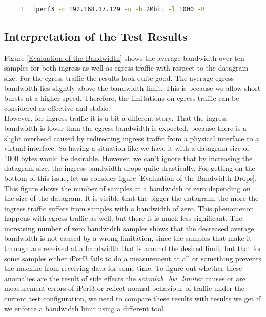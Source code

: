 \begin{lstlisting}[language=sh, caption = Example Ingress Test Command, captionpos=b, numbers=left, frame=single, breaklines=true, breakatwhitespace=true, showstringspaces=false, label=Example Ingress Test Command]
iperf3 -c 192.168.17.129 -u -b 2Mbit -l 1000 -R
\end{lstlisting}

\subsection{Interpretation of the Test Results}

Figure \ref{Evaluation of the Bandwidth} shows the average bandwidth over ten samples for both ingress as well as egress traffic with respect to the datagram size. For the egress traffic the results look quite good. The average egress bandwidth lies slightly above the bandwidth limit. This is because we allow short bursts at a higher speed. Therefore, the limitations on egress traffic can be considered as effective and stable.
\\
However, for ingress traffic it is a bit a different story. That the ingress bandwidth is lower than the egress bandwidth is expected, because there is a slight overhead caused by redirecting ingress traffic from a physical interface to a virtual interface. So having a situation like we have it with a datagram size of 1000 bytes would be desirable. However, we can't ignore that by increasing the datagram size, the ingress bandwidth drops quite drastically. For getting on the bottom of this issue, let us consider figure \ref{Evaluation of the Bandwidth Drops}. This figure shows the number of samples at a bandwidth of zero depending on the size of the datagram. It is visible that the bigger the datagram, the more the ingress traffic suffers from samples with a bandwidth of zero. This phenomenon happens with egress traffic as well, but there it is much less significant. The increasing number of zero bandwidth samples shows that the decreased average bandwidth is not caused by a wrong limitation, since the samples that make it through are received at a bandwidth that is around the desired limit, but that for some samples either iPerf3 fails to do a measurement at all or something prevents the machine from receiving data for some time. To figure out whether these anomalies are the result of side effects the \textit{scionlab\_bw\_limiter} causes or are measurement errors of iPerf3 or reflect normal behaviour of traffic under the current test configuration, we need to compare these results with results we get if we enforce a bandwidth limit using a different tool.

